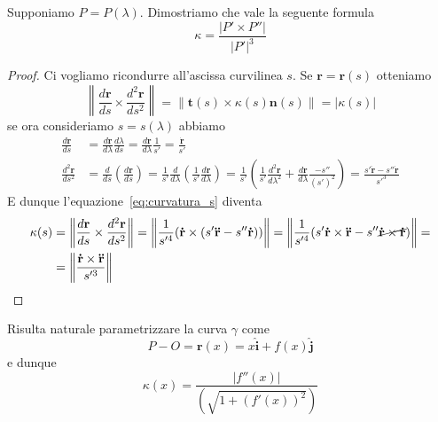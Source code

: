 \begin{example}
    Supponiamo \(P = P{(\lambda)}\). Dimostriamo che vale la seguente formula
    \[
        \kappa = \frac{|P' \times P''|}{|P'|^3}
    \]
    \begin{proof}
        Ci vogliamo ricondurre all'ascissa curvilinea \(s\). Se
        \(\mathbf{r} = \mathbf{r} {(s)}\) otteniamo
        \begin{equation}\label{eq:curvatura_s}
          \left\|\frac{d\mathbf{r} }{ds} \times  \frac{d^2\mathbf{r}
          }{ds^2}\right\| =
          \|\mathbf{t} {(s)} \times \kappa{(s)}\mathbf{n} {(s)}\| =
          |\kappa{(s)}|
        \end{equation}
        se ora consideriamo \(s = s{(\lambda)}\) abbiamo 
        \begin{align*}
            \frac{d\mathbf{r} }{ds} &= \frac{d\mathbf{r} }{d\lambda}
          \frac{d\lambda}{ds} = \frac{d\mathbf{r} }{d\lambda} \frac{1}{s'} =
          \frac{\mathbf{\dot{r}} }{s'}\\
            \frac{d^2 \mathbf{r} }{ds^2} &= \frac{d}{ds} {\left(
            \frac{d\mathbf{r} }{ds} \right)} = \frac{1}{s'} \frac{d}{d\lambda}
            {\left( \frac{1}{s'} \frac{d\mathbf{r} }{d\lambda} \right)} =
            \frac{1}{s'} {\left( \frac{1}{s'} \frac{d^2\mathbf{r}
            }{d\lambda^2} + \frac{d\mathbf{r} }{d\lambda} \frac{-s''}{{(s')}^2}
    \right)} = \frac{s' \mathbf{\ddot{r}}  - s'' \mathbf{\dot{r}}}{s'^3}
        \end{align*}
        E dunque l'equazione~\eqref{eq:curvatura_s} diventa 
        \begin{align*}
            \kappa{(s)} &= \left\|\frac{d\mathbf{r} }{ds} \times  \frac{d^2 \mathbf{r}
          }{ds^2}\right\| = \left\| \frac{1}{s'^{4}} {(\mathbf{\dot{r}} \times
          {(s' \mathbf{\ddot{r}} - s'' \mathbf{\dot{r}} )})}  \right\|
          = \left\| \frac{1}{s'^{4}} {(s' \mathbf{\dot{r}} \times
              \mathbf{\ddot{r}} - s'' \cancel{\mathbf{\dot{r}} \times
              \mathbf{\dot{r}}})}\right\| =
          \\ &= \left\| \frac{\mathbf{\dot{r}} \times  \mathbf{\ddot{r}}
          }{s'^3}\right\|
        \end{align*}
    \end{proof}
\end{example}

\begin{example}[\(\gamma\) grafico di una funzione \(y = f{(x)}\) ]
    Risulta naturale parametrizzare la curva \(\gamma\) come
    \[
        P - O = \mathbf{r} {(x)} = x \mathbf{\hat{i}} + f{(x)} \mathbf{\hat{j}}
    \]
    e dunque
    \[
      \kappa{(x)} = \frac{|f''{(x)}|}{{\left( \sqrt{1 + {(f'{(x)})}^2} \right)} }
    \]
\end{example}

